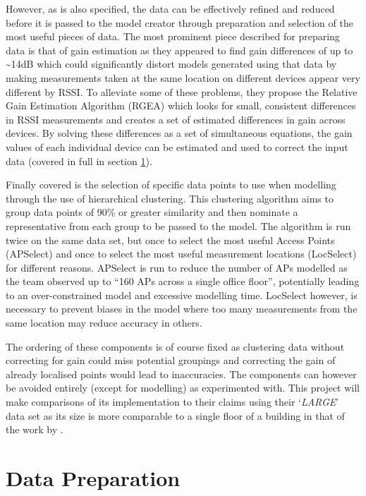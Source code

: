 \documentclass{UoYCSproject}
\begin{document}
            However, as is also specified, the data can be effectively refined and reduced before it is passed to the model creator through preparation and selection of the most useful pieces of data. The most prominent piece described for preparing data is that of gain estimation as they appeared to find gain differences of up to \textasciitilde14dB which could significantly distort models generated using that data by making measurements taken at the same location on different devices appear very different by RSSI. To alleviate some of these problems, they propose the Relative Gain Estimation Algorithm (RGEA) which looks for small, consistent differences in RSSI measurements and creates a set of estimated differences in gain across devices. By solving these differences as a set of simultaneous equations, the gain values of each individual device can be estimated and used to correct the input data (covered in full in section \ref{sec:dataprep}).
            
            Finally covered is the selection of specific data points to use when modelling through the use of hierarchical clustering. This clustering algorithm aims to group data points of 90\% or greater similarity and then nominate a representative from each group to be passed to the model. The algorithm is run twice on the same data set, but once to select the most useful Access Points (APSelect) and once to select the most useful measurement locations (LocSelect) for different reasons. APSelect is run to reduce the number of APs modelled as the team observed up to ``160 APs across a single office floor'', potentially leading to an over-constrained model and excessive modelling time. LocSelect however, is necessary to prevent biases in the model where too many measurements from the same location may reduce accuracy in others.
            
            The ordering of these components is of course fixed as clustering data without correcting for gain could miss potential groupings and correcting the gain of already localised points would lead to inaccuracies. The components can however be avoided entirely (except for modelling) as \citeauthor{chintalapudi2010indoor} experimented with. This project will make comparisons of its implementation to their claims using their `\emph{LARGE}' data set as its size is more comparable to a single floor of a building in that of the work by \citet{torres2014ujiindoorloc}.
		
		\section{Data Preparation}
        \label{sec:dataprep}
        
\end{document}
